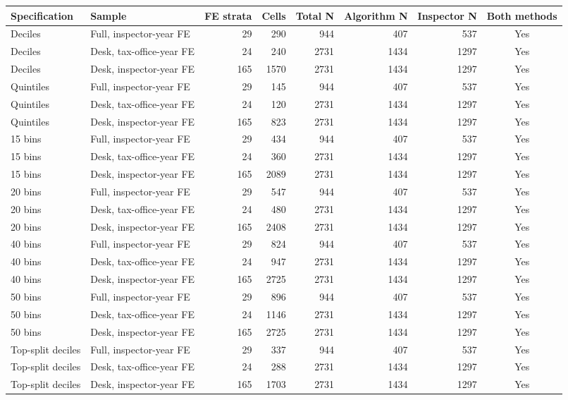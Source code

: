 \begin{tabular}{llrrrrrc}
\toprule
Specification & Sample & FE strata & Cells & Total N & Algorithm N & Inspector N & Both methods \\
\midrule
Deciles & Full, inspector-year FE & 29 & 290 & 944 & 407 & 537 & Yes \\
Deciles & Desk, tax-office-year FE & 24 & 240 & 2731 & 1434 & 1297 & Yes \\
Deciles & Desk, inspector-year FE & 165 & 1570 & 2731 & 1434 & 1297 & Yes \\
Quintiles & Full, inspector-year FE & 29 & 145 & 944 & 407 & 537 & Yes \\
Quintiles & Desk, tax-office-year FE & 24 & 120 & 2731 & 1434 & 1297 & Yes \\
Quintiles & Desk, inspector-year FE & 165 & 823 & 2731 & 1434 & 1297 & Yes \\
15 bins & Full, inspector-year FE & 29 & 434 & 944 & 407 & 537 & Yes \\
15 bins & Desk, tax-office-year FE & 24 & 360 & 2731 & 1434 & 1297 & Yes \\
15 bins & Desk, inspector-year FE & 165 & 2089 & 2731 & 1434 & 1297 & Yes \\
20 bins & Full, inspector-year FE & 29 & 547 & 944 & 407 & 537 & Yes \\
20 bins & Desk, tax-office-year FE & 24 & 480 & 2731 & 1434 & 1297 & Yes \\
20 bins & Desk, inspector-year FE & 165 & 2408 & 2731 & 1434 & 1297 & Yes \\
40 bins & Full, inspector-year FE & 29 & 824 & 944 & 407 & 537 & Yes \\
40 bins & Desk, tax-office-year FE & 24 & 947 & 2731 & 1434 & 1297 & Yes \\
40 bins & Desk, inspector-year FE & 165 & 2725 & 2731 & 1434 & 1297 & Yes \\
50 bins & Full, inspector-year FE & 29 & 896 & 944 & 407 & 537 & Yes \\
50 bins & Desk, tax-office-year FE & 24 & 1146 & 2731 & 1434 & 1297 & Yes \\
50 bins & Desk, inspector-year FE & 165 & 2725 & 2731 & 1434 & 1297 & Yes \\
Top-split deciles & Full, inspector-year FE & 29 & 337 & 944 & 407 & 537 & Yes \\
Top-split deciles & Desk, tax-office-year FE & 24 & 288 & 2731 & 1434 & 1297 & Yes \\
Top-split deciles & Desk, inspector-year FE & 165 & 1703 & 2731 & 1434 & 1297 & Yes \\
\bottomrule
\end{tabular}
